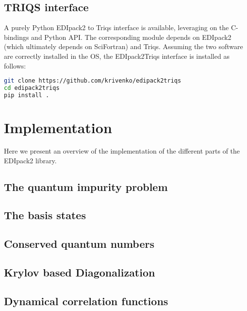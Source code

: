 \documentclass[final,3p,10pt]{elsarticle}
\def\NAME{{\rm EDIpack2 }}
\begin{document}
\subsection{TRIQS interface}
A purely Python \NAME to Triqs interface is available, leveraging on
the C-bindings and Python API. The corresponding module depends on
\NAME (which ultimately depends on SciFortran) and Triqs.
Assuming the two software are correctly installed in the OS, the
EDIpack2Triqs interface is installed as follows:

\begin{lstlisting}[language=Bash]
git clone https://github.com/krivenko/edipack2triqs
cd edipack2triqs
pip install .
\end{lstlisting}











\section{Implementation}\label{SecEDIpack}
Here we present an overview of the implementation of the
different parts of the \NAME library. 

\subsection{The quantum impurity problem}\label{sSecQIM}

\subsection{The  basis states}\label{sSecBasis}

\subsection{Conserved quantum numbers}\label{sSecQNs}

\subsection{Krylov based Diagonalization}\label{sSecHam}

\subsection{Dynamical correlation functions}\label{sSecGF}
\end{document}
